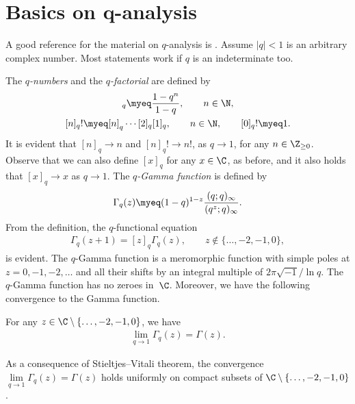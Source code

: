 \appendix

\section[Basics on $q$-analysis]{Basics on $\boldsymbol{q}$-analysis}\label{app:qtheory}


A good reference for the material on $q$-analysis is \cite[Chapter~10]{AAR}. Assume $|q| < 1$ is an arbitrary complex number. Most statements work if $q$ is an indeterminate too.

The \textit{$q$-numbers} and the \textit{$q$-factorial} are def\/ined by
\begin{gather*}
[n]_q \myeq \frac{1 - q^n}{1 - q}, \qquad n\in\N,\\
[n]_q! \myeq [n]_q\cdots[2]_q[1]_q, \qquad n\in\N, \qquad [0]_q! \myeq 1.
\end{gather*}
It is evident that $[n]_q \rightarrow n$ and $[n]_q!\rightarrow n!$, as $q\rightarrow 1$, for any $n\in\Z_{\geq 0}$. Observe that we can also def\/ine $[x]_q$ for any $x\in\C$, as before, and it also holds that $[x]_q \rightarrow x$ as $q\rightarrow 1$. The \textit{$q$-Gamma function} is def\/ined by
\begin{gather*}
\Gamma_q(z) \myeq (1 - q)^{1-z}\frac{(q; q)_{\infty}}{(q^z; q)_{\infty}}.
\end{gather*}
From the def\/inition, the $q$-functional equation
\begin{gather*}
\Gamma_q(z + 1) = [z]_q\Gamma_q(z), \qquad z\notin\{\dots, -2, -1, 0\},
\end{gather*}
is evident. The $q$-Gamma function is a meromorphic function with simple poles at $z = 0, -1, -2, \dots$ and all their shifts by an integral multiple of $2\pi\sqrt{-1}/\ln{q}$.
The $q$-Gamma function has no zeroes in~$\C$. Moreover, we have the following convergence to the Gamma function.

\begin{thm}\label{qtheory1}
For any $z\in\C \setminus \{\dots, -2, -1, 0\}$, we have
\begin{gather*}
\lim_{q\rightarrow 1}{\Gamma_q(z)} = \Gamma(z).
\end{gather*}
\end{thm}
\begin{rem}\label{qtheory1remark}
As a consequence of Stieltjes--Vitali theorem, the convergence $\lim\limits_{q\rightarrow 1}{\Gamma_q(z)} = \Gamma(z)$ holds uniformly on compact subsets of $\C \setminus \{\dots, -2, -1, 0\}$.
\end{rem}

